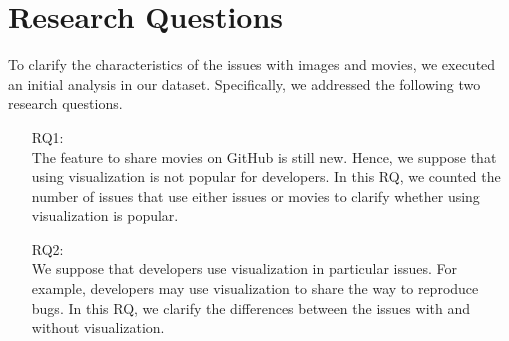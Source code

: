 \section{Research Questions}
\label{sec:rqs}

To clarify the characteristics of 
the issues with images and movies, 
we executed an initial analysis 
in our dataset. 
Specifically, we addressed the following 
two research questions. 
\begin{itemize}
	\item[RQ1:] \textbf{\RQone{}}\\
	The feature to share movies on GitHub 
	is still new. 
	Hence, we suppose that using visualization 
	is not popular for developers. 
	In this RQ, we counted the number of 
	issues that use either issues or movies 
	to clarify whether using visualization 
	is popular. 
	\item[RQ2:] \textbf{\RQtwo{}}\\
	We suppose that developers use visualization 
	in particular issues. 
	For example, developers may use visualization 
	to share the way to reproduce bugs. 
	In this RQ, we clarify the differences 
	between the issues with and without 
	visualization. 
\end{itemize}